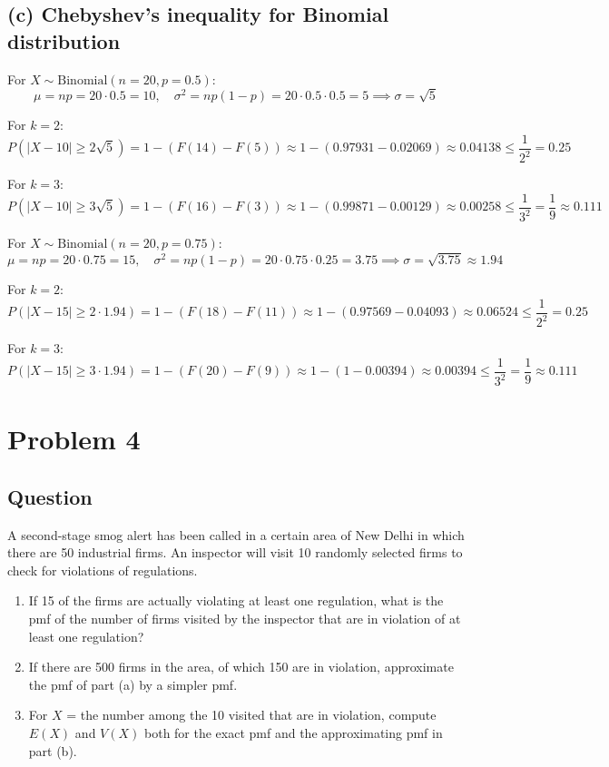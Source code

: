 \documentclass{article}
\begin{document}
\subsection*{(c) Chebyshev's inequality for Binomial distribution}

For \(X \sim \text{Binomial}(n = 20, p = 0.5)\):
\[
\mu = np = 20 \cdot 0.5 = 10, \quad \sigma^2 = np(1-p) = 20 \cdot 0.5 \cdot 0.5 = 5 \implies \sigma = \sqrt{5}
\]

For \(k = 2\):
\[
P(|X - 10| \geq 2\sqrt{5}) =1 - (F(14)-F(5)) \approx 1 - (0.97931 - 0.02069) \approx 0.04138  \leq \frac{1}{2^2} = 0.25
\]

For \(k = 3\):
\[
P(|X - 10| \geq 3\sqrt{5}) =  1 - (F(16)-F(3)) \approx 1 - (0.99871 - 0.00129) \approx 0.00258 \leq \frac{1}{3^2} = \frac{1}{9} \approx 0.111
\]

For \(X \sim \text{Binomial}(n = 20, p = 0.75)\):
\[
\mu = np = 20 \cdot 0.75 = 15, \quad \sigma^2 = np(1-p) = 20 \cdot 0.75 \cdot 0.25 = 3.75 \implies \sigma = \sqrt{3.75} \approx 1.94
\]

For \(k = 2\):
\[
P(|X - 15| \geq 2 \cdot 1.94) =  1 - (F(18)-F(11)) \approx 1 - (0.97569 - 0.04093) \approx 0.06524 \leq \frac{1}{2^2} = 0.25
\]

For \(k = 3\):
\[
P(|X - 15| \geq 3 \cdot 1.94) =  1 - (F(20)-F(9)) \approx 1 - (1 - 0.00394) \approx 0.00394 \leq \frac{1}{3^2} = \frac{1}{9} \approx 0.111
\]

\section*{Problem 4}
\subsection*{Question}
A second-stage smog alert has been called in a certain area of New Delhi in which there are 50 industrial firms. An inspector will visit 10 randomly selected firms to check for violations of regulations.

\begin{enumerate}
    \item If 15 of the firms are actually violating at least one regulation, what is the pmf of the number of firms visited by the inspector that are in violation of at least one regulation?
    \item If there are 500 firms in the area, of which 150 are in violation, approximate the pmf of part (a) by a simpler pmf.
    \item For \(X\) = the number among the 10 visited that are in violation, compute \(E(X)\) and \(V(X)\) both for the exact pmf and the approximating pmf in part (b).
\end{enumerate}
\end{document}
